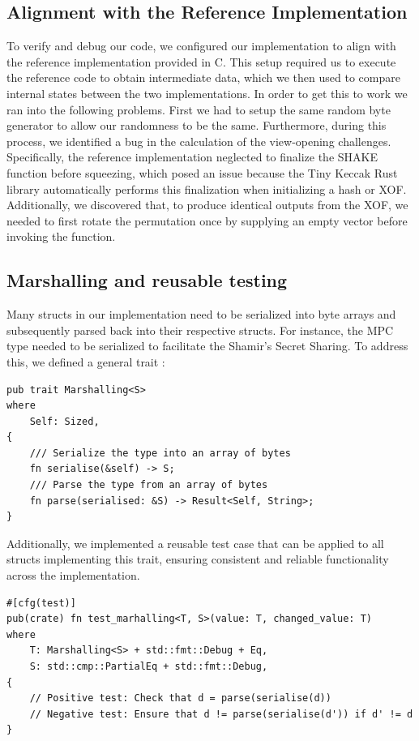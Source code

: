 \documentclass[11pt]{report}
\theoremstyle{definition}
\theoremstyle{plain}
\begin{document}
\subsection{Alignment with the Reference Implementation}\label{sub:comparison_with_spec_impl}
To verify and debug our code, we configured our implementation to align with the reference implementation provided in C. This setup required us to execute the reference code to obtain intermediate data, which we then used to compare internal states between the two implementations. In order to get this to work we ran into the following problems. First we had to setup the same random byte generator to allow our randomness to be the same. Furthermore, during this process, we identified a bug in the calculation of the view-opening challenges. Specifically, the reference implementation neglected to finalize the SHAKE function before squeezing, which posed an issue because the Tiny Keccak Rust library automatically performs this finalization when initializing a hash or XOF.
Additionally, we discovered that, to produce identical outputs from the XOF, we needed to first rotate the permutation once by supplying an empty vector before invoking the function.

\subsection{Marshalling and reusable testing}\label{sub:testing_our_implementation}

Many structs in our implementation need to be serialized into byte arrays and subsequently parsed back into their respective structs. For instance, the MPC  type needed to be serialized to facilitate the Shamir's Secret Sharing. To address this, we defined a general trait :

\begin{verbatim}
pub trait Marshalling<S>
where
    Self: Sized,
{
    /// Serialize the type into an array of bytes
    fn serialise(&self) -> S;
    /// Parse the type from an array of bytes
    fn parse(serialised: &S) -> Result<Self, String>;
}
\end{verbatim}

Additionally, we implemented a reusable test case that can be applied to all structs implementing this trait, ensuring consistent and reliable functionality across the implementation.

\begin{verbatim}
#[cfg(test)]
pub(crate) fn test_marhalling<T, S>(value: T, changed_value: T)
where
    T: Marshalling<S> + std::fmt::Debug + Eq,
    S: std::cmp::PartialEq + std::fmt::Debug,
{
    // Positive test: Check that d = parse(serialise(d))
    // Negative test: Ensure that d != parse(serialise(d')) if d' != d
}
\end{verbatim}
\end{document}
